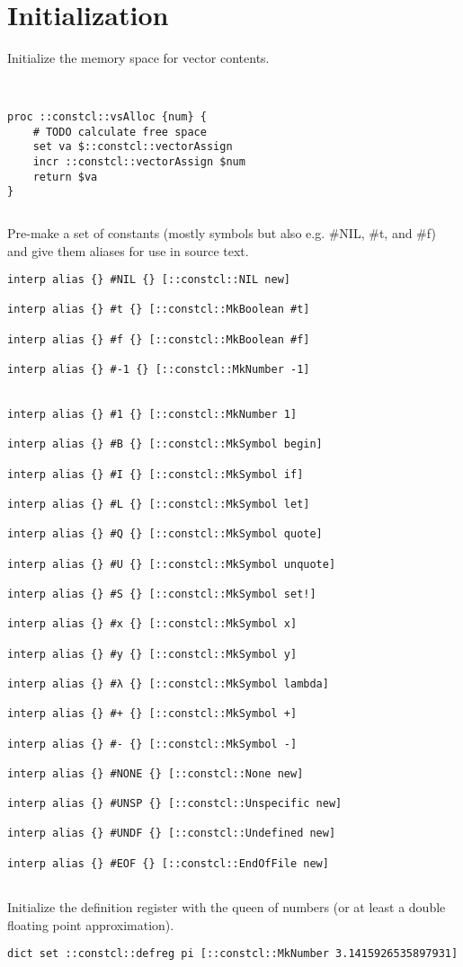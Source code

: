 \documentclass{report}
\begin{document}
\section{Initialization}
\label{initialization}

Initialize the memory space for vector contents.

\noindent\makebox[\linewidth]{\rule{\linewidth}{0.4pt}}
\begin{lstlisting}
 
 
proc ::constcl::vsAlloc {num} {
    # TODO calculate free space
    set va $::constcl::vectorAssign
    incr ::constcl::vectorAssign $num
    return $va
}
\end{lstlisting}
\noindent\makebox[\linewidth]{\rule{\linewidth}{0.4pt}}
\noindent\makebox[\linewidth]{\rule{\linewidth}{0.4pt}}
\begin{lstlisting}
\end{lstlisting}
\noindent\makebox[\linewidth]{\rule{\linewidth}{0.4pt}}

Pre-make a set of constants (mostly symbols but also e.g. \#NIL, \#t, and \#f) and give them aliases for use in source text.

\noindent\makebox[\linewidth]{\rule{\linewidth}{0.4pt}}
\begin{lstlisting}
interp alias {} #NIL {} [::constcl::NIL new]
 
interp alias {} #t {} [::constcl::MkBoolean #t]
 
interp alias {} #f {} [::constcl::MkBoolean #f]
 
interp alias {} #-1 {} [::constcl::MkNumber -1]
 
 
interp alias {} #1 {} [::constcl::MkNumber 1]
 
interp alias {} #B {} [::constcl::MkSymbol begin]
 
interp alias {} #I {} [::constcl::MkSymbol if]
 
interp alias {} #L {} [::constcl::MkSymbol let]
 
interp alias {} #Q {} [::constcl::MkSymbol quote]
 
interp alias {} #U {} [::constcl::MkSymbol unquote]
 
interp alias {} #S {} [::constcl::MkSymbol set!]
 
interp alias {} #x {} [::constcl::MkSymbol x]
 
interp alias {} #y {} [::constcl::MkSymbol y]
 
interp alias {} #λ {} [::constcl::MkSymbol lambda]
 
interp alias {} #+ {} [::constcl::MkSymbol +]
 
interp alias {} #- {} [::constcl::MkSymbol -]
 
interp alias {} #NONE {} [::constcl::None new]
 
interp alias {} #UNSP {} [::constcl::Unspecific new]
 
interp alias {} #UNDF {} [::constcl::Undefined new]
 
interp alias {} #EOF {} [::constcl::EndOfFile new]
 
\end{lstlisting}
\noindent\makebox[\linewidth]{\rule{\linewidth}{0.4pt}}

Initialize the definition register with the queen of numbers (or at least a double floating point approximation).

\noindent\makebox[\linewidth]{\rule{\linewidth}{0.4pt}}
\begin{lstlisting}
dict set ::constcl::defreg pi [::constcl::MkNumber 3.1415926535897931]
\end{lstlisting}
\noindent\makebox[\linewidth]{\rule{\linewidth}{0.4pt}}
\end{document}
